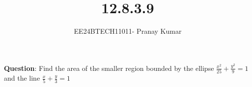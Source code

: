 \documentclass[journal]{IEEEtran}
\begin{document}

\vspace{3cm}

\title{12.8.3.9}
\author{EE24BTECH11011- Pranay Kumar}
{\let\newpage\relax\maketitle}

\renewcommand{\thefigure}{\theenumi}
\renewcommand{\thetable}{\theenumi}
\setlength{\intextsep}{10pt} %


\renewcommand{\thetable}{\theenumi}


\textbf{Question}:\newline
Find the area of the smaller region bounded by the ellipse $\frac{x^2}{25} + \frac{y^2}{9} = 1$ and the line $\frac{x}{5} + \frac{y}{3} = 1$
\end{document}
